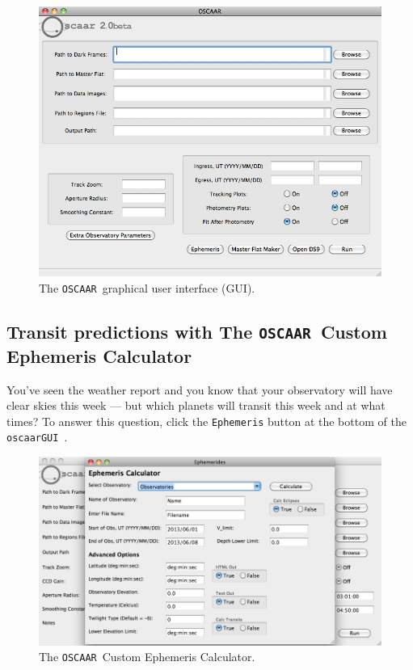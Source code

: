 \documentclass[a4paper]{article}
\newcommand{\code}[1]{\texttt{#1}}
\newcommand{\oscaar}{\code{OSCAAR}~}
\newcommand{\gui}{\code{oscaarGUI}~}
\begin{document}
\begin{figure}[H]
\begin{center}
\includegraphics[scale=0.35]{imgs/GUI.png}
\caption{The \oscaar graphical user interface (GUI).}
\label{fig:gui}
\end{center}	
\end{figure}


\subsection{Transit predictions with The \oscaar Custom Ephemeris Calculator}
You've seen the weather report and you know that your observatory will have clear skies this week --- but which planets will transit this week and at what times? To answer this question, click the \code{Ephemeris} button at the bottom of the \gui.
\begin{figure}[H]
\begin{center}
\includegraphics[scale=0.35]{imgs/ephemeris.png}
\caption{The \oscaar Custom Ephemeris Calculator.}
\label{fig:ephgui}
\end{center}	
\end{figure}
\end{document}
